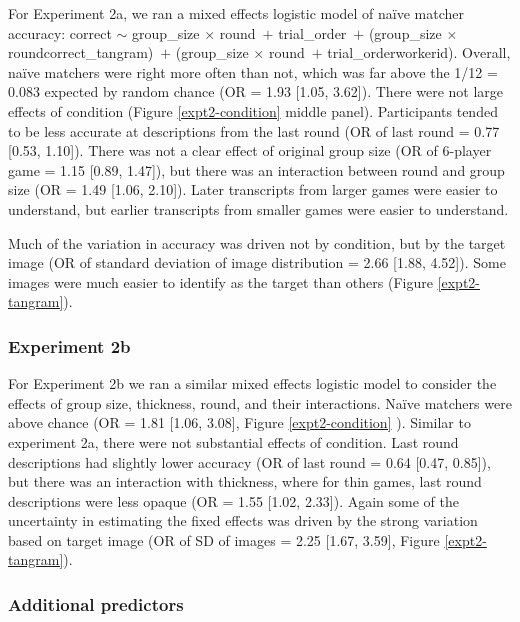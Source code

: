 \documentclass[10pt, letterpaper]{article}
\begin{document}
For Experiment 2a, we ran a mixed effects logistic model of naïve
matcher accuracy: correct \({\sim}\) group\_size \({\times}\)
round~\({+}\) trial\_order~\({+}\) (group\_size \({\times}\)
round\textbar correct\_tangram)~\({+}\) (group\_size \({\times}\)
round~\({+}\) trial\_order\textbar workerid). Overall, naïve matchers
were right more often than not, which was far above the 1/12 = 0.083
expected by random chance (OR = 1.93 {[}1.05, 3.62{]}). There were not
large effects of condition (Figure \ref{expt2-condition} middle panel).
Participants tended to be less accurate at descriptions from the last
round (OR of last round = 0.77 {[}0.53, 1.10{]}). There was not a clear
effect of original group size (OR of 6-player game = 1.15 {[}0.89,
1.47{]}), but there was an interaction between round and group size (OR
= 1.49 {[}1.06, 2.10{]}). Later transcripts from larger games were
easier to understand, but earlier transcripts from smaller games were
easier to understand.

Much of the variation in accuracy was driven not by condition, but by
the target image (OR of standard deviation of image distribution = 2.66
{[}1.88, 4.52{]}). Some images were much easier to identify as the
target than others (Figure \ref{expt2-tangram}).

\subsubsection{Experiment 2b}\label{experiment-2b-1}

For Experiment 2b we ran a similar mixed effects logistic model to
consider the effects of group size, thickness, round, and their
interactions. Naïve matchers were above chance (OR = 1.81 {[}1.06,
3.08{]}, Figure \ref{expt2-condition} ). Similar to experiment 2a, there
were not substantial effects of condition. Last round descriptions had
slightly lower accuracy (OR of last round = 0.64 {[}0.47, 0.85{]}), but
there was an interaction with thickness, where for thin games, last
round descriptions were less opaque (OR = 1.55 {[}1.02, 2.33{]}). Again
some of the uncertainty in estimating the fixed effects was driven by
the strong variation based on target image (OR of SD of images = 2.25
{[}1.67, 3.59{]}, Figure \ref{expt2-tangram}).

\subsubsection{Additional predictors}\label{additional-predictors}
\end{document}
